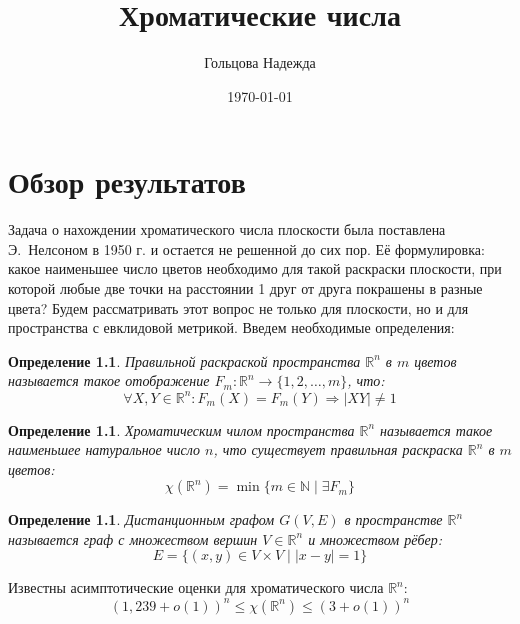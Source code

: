 \documentclass{report}%
\newtheorem{definition}[theorem]{Определение}
\begin{document}
\frenchspacing

\title{Хроматические числа}
\author{Гольцова Надежда}
\date{\today}
\maketitle

\chapter{Обзор результатов}

Задача о нахождении хроматического числа плоскости была поставлена             
Э.~Нелсоном в 1950 г. и остается не решенной до сих пор. Её формулировка: 
какое наименьшее число цветов необходимо для такой раскраски плоскости, 
при которой любые две точки на расстоянии 1 друг от друга покрашены в 
разные цвета? 
Будем рассматривать этот вопрос не только для плоскости, но и для 
пространства с евклидовой метрикой. Введем необходимые определения:

\begin{definition}
		Правильной раскраской пространства $\mathbb{R}^n$ в $m$ цветов называется
		такое отображение $F_m \colon \mathbb{R}^n \rightarrow \{1, 2, \ldots , m \}$, что:
		\begin{equation}
				\forall X, Y \in \mathbb{R}^n \colon F_m(X) = F_m(Y) \Rightarrow |XY| \ne 1
		\end{equation}
\end{definition}

\begin{definition}
		Хроматическим чилом пространства $\mathbb{R}^n$ называется такое наименьшее
		натуральное число $n$, что существует правильная раскраска $\mathbb{R}^n$ в
		$m$ цветов:
		\begin{equation}
				\chi(\mathbb{R}^n) = \min \{m \in \mathbb{N} \mid \exists F_m\}
		\end{equation}
\end{definition}

\begin{definition}
		Дистанционным графом $G(V, E)$ в пространстве $\mathbb{R}^n$ называется граф
		с множеством вершин $V \in \mathbb{R}^n$ и множеством рёбер:
		\begin{equation}
				E = \{(x, y) \in V \times V \mid |x - y| = 1 \}
		\end{equation}
\end{definition}

\noindent Известны асимптотические оценки для хроматического числа $\mathbb{R}^n$:
\begin{equation}
		(1,239 + o(1))^n \leq \chi(\mathbb{R}^n) \leq (3 + o(1))^n
\end{equation}
\end{document}
